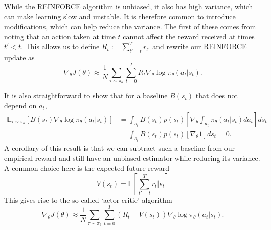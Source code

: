 While the REINFORCE algorithm is unbiased, it also has high variance, which can make learning slow and unstable.
It is therefore common to introduce modifications, which can help reduce the variance.
The first of these comes from noting that an action taken at time $t$ cannot affect the reward received at times $t'<t$.
This allows us to define $R_t := \sum_{t'=t}^T r_{t'}$ and rewrite our REINFORCE update as
\begin{equation}
    \nabla_\theta J(\theta) \approx \frac{1}{N} \sum_{\tau \sim \pi_\theta}  \sum_{t=0}^T R_t \nabla_\theta \log \pi_\theta (a_t|s_t).
\end{equation}

It is also straightforward to show that for a baseline $B(s_t)$ that does not depend on $a_t$,
\begin{align}
    \mathbb{E}_{\tau \sim \pi_\theta} \left [ B(s_t) \nabla_\theta \log \pi_\theta (a_t|s_t) \right ]
     & = \int_{s_t} B(s_t) p(s_t) \left [ \nabla_\theta \int_{a_t} \pi_\theta (a_t|s_t) da_t \right ] ds_t \\
     & = \int_{s_t} B(s_t) p(s_t) \left [ \nabla_\theta 1 \right ] ds_t = 0.
\end{align}
A corollary of this result is that we can subtract such a baseline from our empirical reward and still have an unbiased estimator while reducing its variance.
A common choice here is the expected future reward
\begin{equation}
    V(s_t) = \mathbb{E} \left [ \sum_{t' = t}^T r_t | s_t \right ]
\end{equation}
This gives rise to the so-called `actor-critic' algorithm
\begin{equation}
    \nabla_\theta J(\theta) \approx \frac{1}{N} \sum_{\tau \sim \pi_\theta}  \sum_{t=0}^T (R_t - V(s_t)) \nabla_\theta \log \pi_\theta (a_t|s_t).
\end{equation}

